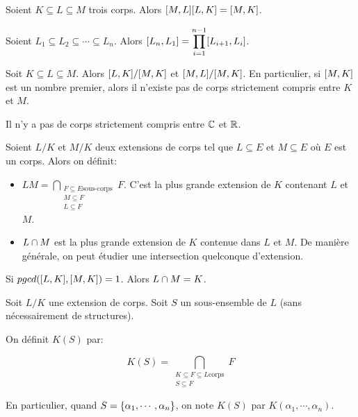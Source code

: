 \begin{proposition} 
	Soient $K \subseteq L \subseteq M$ trois corps. Alors
	$[M, L] [L, K] = [M, K]$.
\end{proposition}

\begin{proposition} 
	Soient $L_{1} \subseteq L_{2} \subseteq \cdots \subseteq L_{n}$.
	Alors $[L_{n}, L_{1}] =
	\displaystyle \prod_{i = 1}^{n - 1} [L_{i + 1}, L_{i}]$.
\end{proposition}

\begin{remarque}
	Soit $K \subseteq L \subseteq M$. Alors $[L, K] /
	[M, K]$ et $[M, L] /
	[M, K]$. En particulier, si $[M, K]$ est un
	nombre premier, alors il n'existe pas de corps strictement compris entre $K$
	et $M$.
\end{remarque}

\begin{exercice}
	Il n'y a pas de corps strictement compris entre $\mathbb{C}$ et $\mathbb{R}$.
\end{exercice}

\begin{definition}
	Soient $L/K$ et $M/K$ deux extensions de corps tel que $L \subseteq E$ et $M
	\subseteq E$ où $E$ est un corps. Alors on définit:

	\begin{itemize}
		\item $LM = \displaystyle \bigcap_{\substack{F \subseteq E
				\text{sous-corps} \\ M \subseteq F \\ L \subseteq F}}
	F$. C'est la plus grande extension de $K$ contenant $L$ et $M$.
		\item $L \cap M$ est la plus grande extension de $K$ contenue dans $L$
			et $M$. De manière générale, on peut étudier une intersection
			quelconque d'extension.
	\end{itemize}
\end{definition}

\begin{exercice}
	Si $pgcd([L, K], [M, K]) = 1$. Alors $L
	\cap M = K$.
\end{exercice}

\begin{definition}
	Soit $L/K$ une extension de corps. Soit $S$ un sous-ensemble de $L$ (sans
	nécessairement de structures).

	On définit $K(S)$ par:

	\begin{equation*}
		K(S) = \displaystyle \bigcap_{\substack{K \subseteq F \subseteq L
			\text{corps} \\ S \subseteq F}} F
	\end{equation*}

	En particulier, quand $S = \left\{ \alpha_{1}, \cdots, \alpha_{n} \right\}$, on note
	$K(S)$ par $K(\alpha_{1}, \cdots, \alpha_{n})$.
\end{definition}

